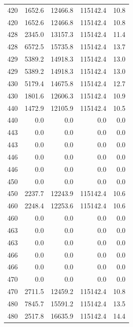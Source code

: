 \begin{longtable}{rrrrr}
    420 & \num{1652.6} & \num{12466.8} & \num{115142.4} & 10.8 \\
    420 & \num{1652.6} & \num{12466.8} & \num{115142.4} & 10.8 \\
    428 & \num{2345.0} & \num{13157.3} & \num{115142.4} & 11.4 \\
    428 & \num{6572.5} & \num{15735.8} & \num{115142.4} & 13.7 \\
    429 & \num{5389.2} & \num{14918.3} & \num{115142.4} & 13.0 \\
    429 & \num{5389.2} & \num{14918.3} & \num{115142.4} & 13.0 \\
    430 & \num{5179.4} & \num{14675.8} & \num{115142.4} & 12.7 \\
    430 & \num{1801.6} & \num{12606.3} & \num{115142.4} & 10.9 \\
    440 & \num{1472.9} & \num{12105.9} & \num{115142.4} & 10.5 \\
    440 & \num{0.0} & \num{0.0} & \num{0.0} & 0.0 \\
    443 & \num{0.0} & \num{0.0} & \num{0.0} & 0.0 \\
    443 & \num{0.0} & \num{0.0} & \num{0.0} & 0.0 \\
    446 & \num{0.0} & \num{0.0} & \num{0.0} & 0.0 \\
    446 & \num{0.0} & \num{0.0} & \num{0.0} & 0.0 \\
    450 & \num{0.0} & \num{0.0} & \num{0.0} & 0.0 \\
    450 & \num{2237.7} & \num{12243.9} & \num{115142.4} & 10.6 \\
    460 & \num{2248.4} & \num{12253.6} & \num{115142.4} & 10.6 \\
    460 & \num{0.0} & \num{0.0} & \num{0.0} & 0.0 \\
    463 & \num{0.0} & \num{0.0} & \num{0.0} & 0.0 \\
    463 & \num{0.0} & \num{0.0} & \num{0.0} & 0.0 \\
    466 & \num{0.0} & \num{0.0} & \num{0.0} & 0.0 \\
    466 & \num{0.0} & \num{0.0} & \num{0.0} & 0.0 \\
    470 & \num{0.0} & \num{0.0} & \num{0.0} & 0.0 \\
    470 & \num{2711.5} & \num{12459.2} & \num{115142.4} & 10.8 \\
    480 & \num{7845.7} & \num{15591.2} & \num{115142.4} & 13.5 \\
    480 & \num{2517.8} & \num{16635.9} & \num{115142.4} & 14.4 \\

\end{longtable}
